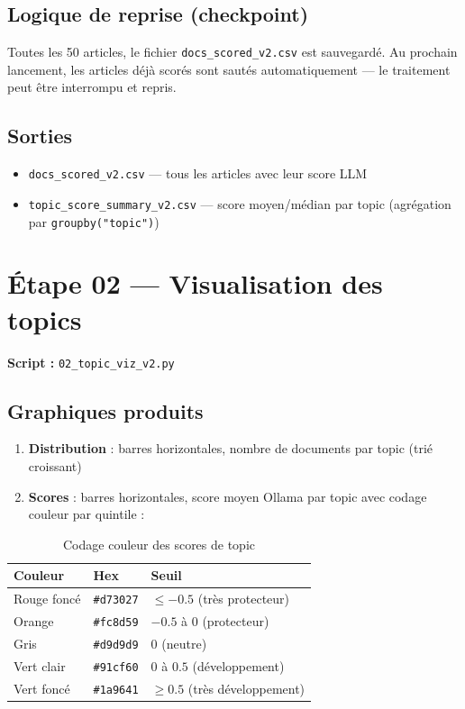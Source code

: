 \documentclass[12pt,a4paper]{report}
\newcommand{\code}[1]{\texttt{\small #1}}
\begin{document}
\subsection{Logique de reprise (checkpoint)}

Toutes les 50 articles, le fichier \code{docs\_scored\_v2.csv} est sauvegardé. Au prochain lancement, les articles déjà scorés sont sautés automatiquement — le traitement peut être interrompu et repris.

\subsection{Sorties}

\begin{itemize}
  \item \code{docs\_scored\_v2.csv} — tous les articles avec leur score LLM
  \item \code{topic\_score\_summary\_v2.csv} — score moyen/médian par topic (agrégation par \code{groupby("topic")})
\end{itemize}

\section{Étape 02 — Visualisation des topics}

\textbf{Script :} \code{02\_topic\_viz\_v2.py}

\subsection{Graphiques produits}

\begin{enumerate}
  \item \textbf{Distribution} : barres horizontales, nombre de documents par topic (trié croissant)
  \item \textbf{Scores} : barres horizontales, score moyen Ollama par topic avec codage couleur par quintile :
\end{enumerate}

\begin{table}[H]
\centering
\begin{tabular}{lll}
\toprule
\textbf{Couleur} & \textbf{Hex} & \textbf{Seuil} \\
\midrule
\cellcolor{scoreQ1!60}Rouge foncé & \code{\#d73027} & $\leq -0.5$ (très protecteur) \\
\cellcolor{scoreQ4!40}Orange & \code{\#fc8d59} & $-0.5$ à $0$ (protecteur) \\
\cellcolor{scoreQ3!60}Gris & \code{\#d9d9d9} & $0$ (neutre) \\
\cellcolor{scoreQ2!40}Vert clair & \code{\#91cf60} & $0$ à $0.5$ (développement) \\
\cellcolor{scoreQ1!40}Vert foncé & \code{\#1a9641} & $\geq 0.5$ (très développement) \\
\bottomrule
\end{tabular}
\caption{Codage couleur des scores de topic}
\end{table}
\end{document}
